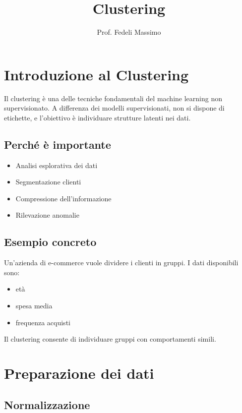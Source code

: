\documentclass[12pt,a4paper]{article}
\title{Clustering}
\author{Prof. Fedeli Massimo}
\date{}
\begin{document}
	
	\maketitle
	\tableofcontents
	\newpage
	
	\section{Introduzione al Clustering}
	
	Il clustering è una delle tecniche fondamentali del machine learning non supervisionato. A differenza dei modelli supervisionati, non si dispone di etichette, e l'obiettivo è individuare strutture latenti nei dati.
	
	\subsection{Perché è importante}
	
	\begin{itemize}
		\item Analisi esplorativa dei dati
		\item Segmentazione clienti
		\item Compressione dell'informazione
		\item Rilevazione anomalie
	\end{itemize}
	
	\subsection{Esempio concreto}
	
	Un'azienda di e-commerce vuole dividere i clienti in gruppi. I dati disponibili sono:
	\begin{itemize}
		\item età
		\item spesa media
		\item frequenza acquisti
	\end{itemize}
	
	Il clustering consente di individuare gruppi con comportamenti simili.
	
	\section{Preparazione dei dati}
	
	\subsection{Normalizzazione}
	
\end{document}
